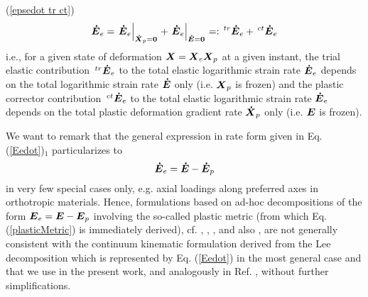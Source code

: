 \documentclass[preprint,review,12pt,sort&compress]{elsarticle}%
\newcommand{\xpdo}[0]{\scriptsize\mathbf{\dot X}_p = \mathbf{0}\normalsize\mathbf{}}
\newcommand{\edo}[0]{\scriptsize\mathbf{\dot E} = \mathbf{0}\normalsize\mathbf{}}
\renewcommand{\mathbf}[1]{\mbox{\boldmath $#1$ \unboldmath}  \!\!}
\begin{document}
(\ref{epsedot tr ct})%
\begin{equation}
\mathbf{\dot{E}}_{e}=\left.  \mathbf{\dot{E}}_{e}\right\vert _{%
\xpdo
}+\left.  \mathbf{\dot{E}}_{e}\right\vert _{%
\edo
}=:\,^{tr}\mathbf{\dot{E}}_{e}+\,^{ct}\mathbf{\dot{E}}_{e} \label{Eedot tr ct}%
\end{equation}
i.e., for a given state of deformation $\mathbf{X}=\mathbf{X}_{e}%
\mathbf{X}_{p}$ at a given instant, the trial elastic contribution
$\,^{tr}\mathbf{\dot{E}}_{e}$ to the total elastic logarithmic strain rate
$\mathbf{\dot{E}}_{e}$ depends on the total logarithmic strain rate
$\mathbf{\dot{E}}$ only (i.e. $\mathbf{X}_{p}$ is frozen) and the plastic
corrector contribution $\,^{ct}\mathbf{\dot{E}}_{e}$ to the total elastic
logarithmic strain rate $\mathbf{\dot{E}}_{e}$ depends on the total plastic
deformation gradient rate $\mathbf{\dot{X}}_{p}$ only (i.e. $\mathbf{E}$ is frozen).

We want to remark that the general expression in rate form given in Eq.
(\ref{Eedot})$_{1}$ particularizes to%
\begin{equation}
\mathbf{\dot{E}}_{e}=\mathbf{\dot{E}}-\mathbf{\dot{E}}_{p}
\label{plasticMetric}%
\end{equation}
in very few special cases only, e.g. axial loadings along preferred axes in
orthotropic materials. Hence, formulations based on ad-hoc decompositions of
the form $\mathbf{E}_{e}=\mathbf{E}-\mathbf{E}_{p}$ involving the so-called
plastic metric (from which Eq. (\ref{plasticMetric}) is immediately derived),
cf. \cite{PapadopoulusLu98}, \cite{Miehe02}, \cite{SansourWagner03},
\cite{Ulz09} and also \cite{Schmidt05}, are not generally consistent with the
continuum kinematic formulation derived from the Lee decomposition which is
represented by Eq. (\ref{Eedot}) in the most general case and that we use in
the present work, and analogously in Ref. \cite{LatMonCM2015}, without further simplifications.
\end{document}

